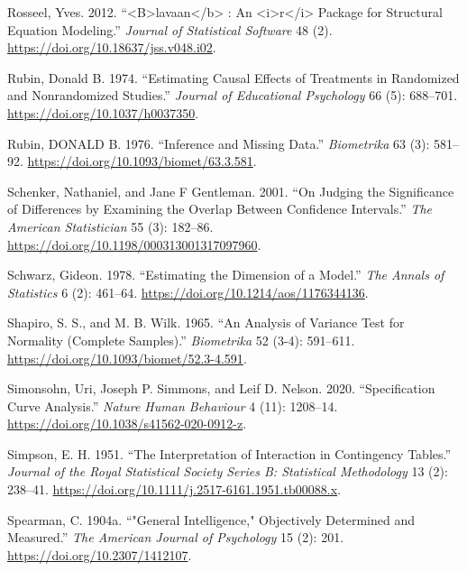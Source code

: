 \documentclass[
  letterpaper,
  10pt,
  twoside,
  openright,
  numbers=noenddot,
  chapterprefix=true]{scrbook}
\newlength{\cslhangindent}
\newenvironment{CSLReferences}[2] %
 {\begin{list}{}{%
  \setlength{\itemindent}{0pt}
  \setlength{\leftmargin}{0pt}
  \setlength{\parsep}{0pt}
  \ifodd #1
   \setlength{\leftmargin}{\cslhangindent}
   \setlength{\itemindent}{-1\cslhangindent}
  \fi
  \setlength{\itemsep}{#2\baselineskip}}}
 {\end{list}}
\begin{document}
\begin{CSLReferences}{1}{0}
Rosseel, Yves. 2012.
{``\textless B\textgreater lavaan\textless/b\textgreater{} : {An}
\textless i\textgreater r\textless/i\textgreater{} {Package} for
{Structural} {Equation} {Modeling}.''} \emph{{Journal} of {Statistical}
{Software}} 48 (2). \url{https://doi.org/10.18637/jss.v048.i02}.

Rubin, Donald B. 1974. {``{Estimating} Causal Effects of Treatments in
Randomized and Nonrandomized Studies.''} \emph{{Journal} of
{Educational} {Psychology}} 66 (5): 688--701.
\url{https://doi.org/10.1037/h0037350}.

Rubin, DONALD B. 1976. {``{Inference} and Missing Data.''}
\emph{{Biometrika}} 63 (3): 581--92.
\url{https://doi.org/10.1093/biomet/63.3.581}.

Schenker, Nathaniel, and Jane F Gentleman. 2001. {``{On} {Judging} the
{Significance} of {Differences} by {Examining} the {Overlap} {Between}
{Confidence} {Intervals}.''} \emph{{The} {American} {Statistician}} 55
(3): 182--86. \url{https://doi.org/10.1198/000313001317097960}.

Schwarz, Gideon. 1978. {``{Estimating} the {Dimension} of a {Model}.''}
\emph{{The} {Annals} of {Statistics}} 6 (2): 461--64.
\url{https://doi.org/10.1214/aos/1176344136}.

Shapiro, S. S., and M. B. Wilk. 1965. {``{An} Analysis of Variance Test
for Normality (Complete Samples).''} \emph{{Biometrika}} 52 (3-4):
591--611. \url{https://doi.org/10.1093/biomet/52.3-4.591}.

Simonsohn, Uri, Joseph P. Simmons, and Leif D. Nelson. 2020.
{``{Specification} Curve Analysis.''} \emph{{Nature} {Human}
{Behaviour}} 4 (11): 1208--14.
\url{https://doi.org/10.1038/s41562-020-0912-z}.

Simpson, E. H. 1951. {``{The} {Interpretation} of {Interaction} in
{Contingency} {Tables}.''} \emph{{Journal} of the {Royal} {Statistical}
{Society} {Series} B: {Statistical} {Methodology}} 13 (2): 238--41.
\url{https://doi.org/10.1111/j.2517-6161.1951.tb00088.x}.

Spearman, C. 1904a. {``"{General} {Intelligence}," {Objectively}
{Determined} and {Measured}.''} \emph{{The} {American} {Journal} of
{Psychology}} 15 (2): 201. \url{https://doi.org/10.2307/1412107}.


\end{CSLReferences}
\end{document}
